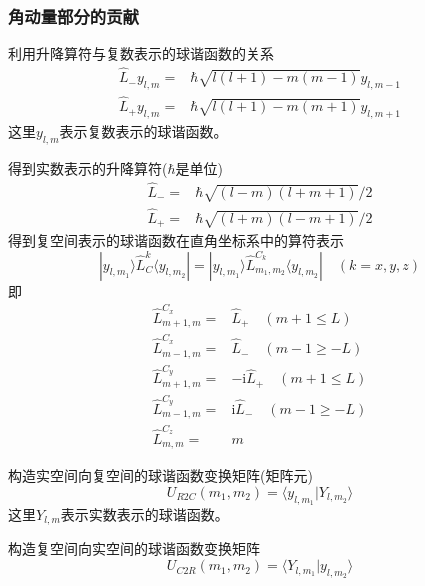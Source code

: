 \documentclass[10pt, oneside, a4paper]{article}      %
\begin{document}
\subsubsection{角动量部分的贡献}
利用升降算符与复数表示的球谐函数的关系
\begin{displaymath}
	\begin{aligned}
		\hat{L}_-y_{l,m}=&\hbar\sqrt{l(l+1)-m(m-1)}y_{l,m-1}\\
		\hat{L}_+y_{l,m}=&\hbar\sqrt{l(l+1)-m(m+1)}y_{l,m+1}
	\end{aligned}
\end{displaymath}
这里$y_{l,m}$表示复数表示的球谐函数。

得到实数表示的升降算符($\hbar$是单位)
\begin{displaymath}
	\begin{aligned}
		\hat{L}_-=&\hbar\sqrt{(l-m)(l+m+1)}/2\\
		\hat{L}_+=&\hbar\sqrt{(l+m)(l-m+1)}/2
	\end{aligned}
\end{displaymath}
得到复空间表示的球谐函数在直角坐标系中的算符表示
\begin{displaymath}
	|y_{l,m_1}\rangle\hat{L}_C^{k}\langle y_{l,m_2}|=|y_{l,m_1}\rangle\hat{L}_{m_1,m_2}^{C_k}\langle y_{l,m_2}| \quad (k=x,y,z)
\end{displaymath}
即
\begin{displaymath}
	\begin{aligned}
		\hat{L}_{m+1,m}^{C_x} =& \hat{L}_+ \quad (m+1\leqslant L)\\
		\hat{L}_{m-1,m}^{C_x} =& \hat{L}_- \quad (m-1\geqslant -L)\\
		\hat{L}_{m+1,m}^{C_y} =& -\mathrm{i}\hat{L}_+ \quad (m+1\leqslant L)\\
		\hat{L}_{m-1,m}^{C_y} =& \mathrm{i}\hat{L}_- \quad (m-1\geqslant -L)\\
		\hat{L}_{m,m}^{C_z} =& m
	\end{aligned}
\end{displaymath}

构造实空间向复空间的球谐函数变换矩阵(矩阵元)
\begin{displaymath}
	U_{R2C}(m_1,m_2)=\langle y_{l,m_1}|Y_{l,m_2}\rangle
\end{displaymath}
这里$Y_{l,m}$表示实数表示的球谐函数。

构造复空间向实空间的球谐函数变换矩阵
\begin{displaymath}
	U_{C2R}(m_1,m_2)=\langle Y_{l,m_1}|y_{l,m_2}\rangle
\end{displaymath}
\end{document}
